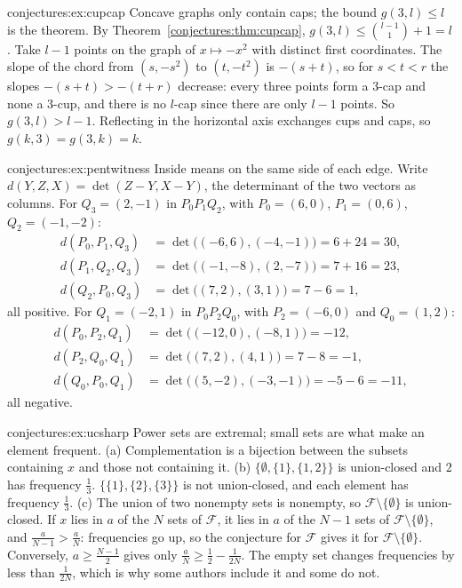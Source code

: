 \begin{solution}{conjectures:ex:cupcap}
\idea Concave graphs only contain caps; the bound $g(3,l)\le l$ is the theorem.
\writeup By Theorem~\ref{conjectures:thm:cupcap}, $g(3,l)\le\binom{l-1}1+1=l$. Take $l-1$ points on the graph of $x\mapsto-x^2$ with distinct first coordinates.
The slope of the chord from $(s,-s^2)$ to $(t,-t^2)$ is $-(s+t)$, so for $s<t<r$ the slopes $-(s+t)>-(t+r)$ decrease: every three points form a $3$-cap and
none a $3$-cup, and there is no $l$-cap since there are only $l-1$ points. So $g(3,l)>l-1$. Reflecting in the horizontal axis exchanges cups and caps,
so $g(k,3)=g(3,k)=k$.
\end{solution}

\begin{solution}{conjectures:ex:pentwitness}
\idea Inside means on the same side of each edge.
\writeup Write $d(Y,Z,X)=\det(Z-Y,X-Y)$, the determinant of the two vectors as columns. For $Q_3=(2,-1)$ in $P_0P_1Q_2$, with $P_0=(6,0)$,
$P_1=(0,6)$, $Q_2=(-1,-2)$:
\[
\begin{aligned}d(P_0,P_1,Q_3)&=\det\bigl((-6,6),(-4,-1)\bigr)=6+24=30,\\ d(P_1,Q_2,Q_3)&=\det\bigl((-1,-8),(2,-7)\bigr)=7+16=23,\\
d(Q_2,P_0,Q_3)&=\det\bigl((7,2),(3,1)\bigr)=7-6=1,\end{aligned}
\]
all positive. For $Q_1=(-2,1)$ in $P_0P_2Q_0$, with $P_2=(-6,0)$ and $Q_0=(1,2)$:
\[
\begin{aligned}d(P_0,P_2,Q_1)&=\det\bigl((-12,0),(-8,1)\bigr)=-12,\\ d(P_2,Q_0,Q_1)&=\det\bigl((7,2),(4,1)\bigr)=7-8=-1,\\
d(Q_0,P_0,Q_1)&=\det\bigl((5,-2),(-3,-1)\bigr)=-5-6=-11,\end{aligned}
\]
all negative.
\end{solution}

\begin{solution}{conjectures:ex:ucsharp}
\idea Power sets are extremal; small sets are what make an element frequent.
\writeup (a) Complementation is a bijection between the subsets containing $x$ and those not containing it. (b) $\{\emptyset,\{1\},\{1,2\}\}$ is
union-closed and $2$ has frequency $\frac13$. $\{\{1\},\{2\},\{3\}\}$ is not union-closed, and each element has frequency $\frac13$. (c) The union of two nonempty sets is nonempty, so $\mathcal F\setminus\{\emptyset\}$ is union-closed. If $x$ lies in $a$ of the $N$ sets
of $\mathcal F$, it lies in $a$ of the $N-1$ sets of $\mathcal F\setminus\{\emptyset\}$, and $\frac a{N-1}>\frac aN$: frequencies go up, so the
conjecture for $\mathcal F$ gives it for $\mathcal F\setminus\{\emptyset\}$. Conversely, $a\ge\frac{N-1}2$ gives only
$\frac aN\ge\frac12-\frac1{2N}$. The empty set changes frequencies by less than $\frac1{2N}$, which is why some authors include it and some do not.
\end{solution}

